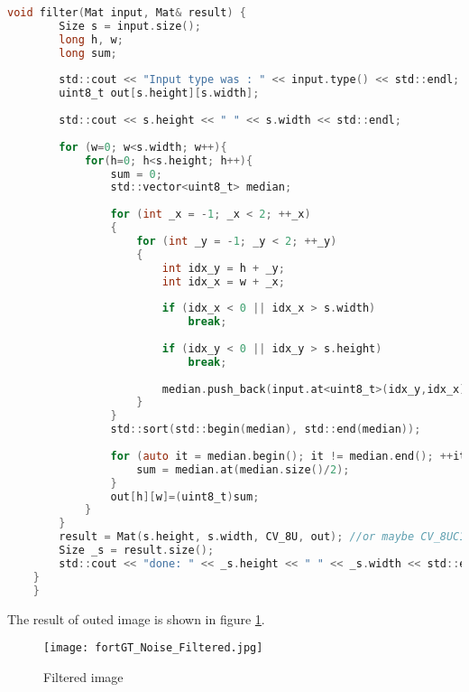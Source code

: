 \begin{lstlisting}[language=C, caption=Noise correction filter, label=lst:noise_filter]
    void filter(Mat input, Mat& result) {
        Size s = input.size();
        long h, w;
        long sum;
        
        std::cout << "Input type was : " << input.type() << std::endl;
        uint8_t out[s.height][s.width];
        
        std::cout << s.height << " " << s.width << std::endl;
        
        for (w=0; w<s.width; w++){
            for(h=0; h<s.height; h++){
                sum = 0;
                std::vector<uint8_t> median;
                
                for (int _x = -1; _x < 2; ++_x)
                {
                    for (int _y = -1; _y < 2; ++_y)
                    {
                        int idx_y = h + _y;
                        int idx_x = w + _x;
                        
                        if (idx_x < 0 || idx_x > s.width)
                            break;
                            
                        if (idx_y < 0 || idx_y > s.height)
                            break;
                        
                        median.push_back(input.at<uint8_t>(idx_y,idx_x));
                    }
                }
                std::sort(std::begin(median), std::end(median));
                        
                for (auto it = median.begin(); it != median.end(); ++it) {
                    sum = median.at(median.size()/2);
                }
                out[h][w]=(uint8_t)sum;
            }
        }
        result = Mat(s.height, s.width, CV_8U, out); //or maybe CV_8UC1?
        Size _s = result.size();
        std::cout << "done: " << _s.height << " " << _s.width << std::endl;
    }
    }
\end{lstlisting}


The result of outed image is shown in figure \ref{fig:fortGT_Noise_Filtered}.

\begin{figure}[h!]
    \centering
    \texttt{[image: fortGT\_Noise\_Filtered.jpg]}
    \caption{Filtered image}
    \label{fig:fortGT_Noise_Filtered}
\end{figure}